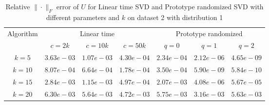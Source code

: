 \begin{table}\label{U21}
\centering
\begin{tabular}{|c|c|c|c|c|c|c|}

\hline
\multirow{2}{*}{ Algorithm} &\multicolumn{3}{c|}{Linear time} &\multicolumn{3}{c|}{Prototype randomized}\\\cline{2-7}
 &$c=2k$ &$c=10k$ &$c=50k$ &$q=0$ &$q=1$ &$q=2$\\\hline
$k=5$ & $3.63e-03$ & $1.07e-03$ & $4.30e-04$ & $2.34e-04$ & $2.12e-06$ & $4.65e-09$\\\hline
$k=10$ & $8.07e-04$ & $6.64e-04$ & $1.78e-04$ & $3.50e-04$ & $5.90e-09$ & $5.84e-10$\\\hline
$k=15$ & $2.84e-03$ & $1.15e-03$ & $4.97e-04$ & $2.07e-03$ & $4.08e-06$ & $5.67e-05$\\\hline
$k=20$ & $6.30e-03$ & $5.64e-03$ & $4.72e-03$ & $5.75e-03$ & $3.16e-03$ & $5.63e-03$\\\hline
\end{tabular}
\caption{Relative $\|\cdot\|_F$ error of $U$ for Linear time SVD and Prototype randomized SVD with different parameters and $k$ on dataset 2 with distribution 1}
\end{table}
